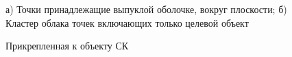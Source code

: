 \begin{figure}[h!]
	\begin{minipage}[h]{0.5\linewidth}
	\end{minipage}
	\hfill
	\begin{minipage}[h]{0.5\linewidth}
	\end{minipage}
	\caption{а) Точки принадлежащие выпуклой оболочке, вокруг плоскости; б) Кластер облака точек включающих только целевой объект}
	\label{img:hull}
\end{figure}

\begin{figure}[h!]
	\vspace{0.2cm}
	\caption{Прикрепленная к объекту СК}
	\label{img:frame}
\end{figure}

\clearpage
\newpage